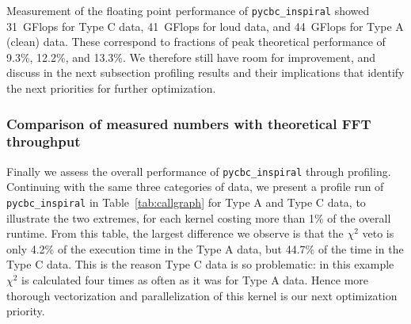 Measurement of the floating point performance of \texttt{pycbc\_inspiral} showed
31~GFlops for Type C data, 41~GFlops for loud data, and 44~GFlops for Type A
(clean)
data.  These correspond to fractions of peak theoretical performance of 9.3\%,
12.2\%, and 13.3\%. We therefore still have room for improvement, and discuss in
the next subsection profiling results and their implications that identify the
next priorities for further optimization.


\vspace*{-10pt}
\subsubsection{Comparison of measured numbers with theoretical FFT throughput}
\vspace*{-05pt}
\label{sec:measured}

Finally we assess the overall performance of \texttt{pycbc\_inspiral} through
profiling. Continuing with the same three categories of data, we present a
profile run of \texttt{pycbc\_inspiral} in Table~\ref{tab:callgraph} for Type A and Type C data, to illustrate the two
extremes, for each kernel costing more than 1\% of the overall runtime. From
this table, the largest difference we observe is that the 
$\chi^2$ veto is only 4.2\% of the execution time in the Type A data, but 44.7\%
of the time in the Type C data. This is the reason Type C data is so problematic:
in this example $\chi^2$ is calculated four times as often as it was for Type
A data.
Hence more thorough vectorization and parallelization of this kernel is our next
optimization priority.

